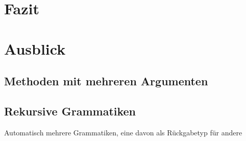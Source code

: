 \documentclass[../InterneDSLs.tex]{subfiles}
\begin{document}
\chapter{Fazit}

\chapter{Ausblick}
\section{Methoden mit mehreren Argumenten}
\section{Rekursive Grammatiken}
Automatisch mehrere Grammatiken, eine davon als Rückgabetyp für andere
\end{document}
